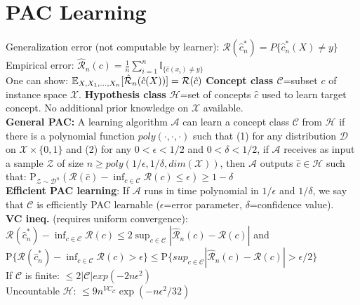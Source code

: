 \section{PAC Learning}

Generalization error (not computable by learner): $\mathcal{R}(\hat{c}_n^*) = P\{ \hat{c}_n^*(X)\neq y \}$ \\
Empirical error: $\hat{\mathcal{R}}_n(c) = \tfrac{1}{n}\sum_{i=1}^n \mathbb{I}_{\{\hat c(x_i)\neq y\}}$ \\
One can show: $\mathbb E_{X,X_1,...,X_n}[\hat{\mathcal{R}}_n(\hat c(X))]=\mathcal{R}(\hat c)$
\textbf{Concept class $\mathcal{C}$}=subset $c$ of instance space $\mathcal{X}$.
\textbf{Hypothesis class $\mathcal{H}$}=set of concepts $\hat c$ used to learn target concept. No additional prior knowledge on $\mathcal{X}$ available.\\
\textbf{General PAC:} A learning algorithm $\mathcal{A}$ can learn a concept class $\mathcal{C}$ from $\mathcal{H}$ if there is a polynomial function $poly(\cdot,\cdot,\cdot)$ such that (1) for any distribution $\mathcal{D}$ on $\mathcal{X} \times \{0,1\}$ and (2) for any $0<\epsilon<1/2$ and $0<\delta<1/2$, if $\mathcal{A}$ receives as input a sample $\mathcal{Z}$ of size $n\geq poly(1/\epsilon,1/\delta,dim(\mathcal{X}))$, then $\mathcal{A}$ outputs $\hat c \in \mathcal{H}$ such that: $\mathrm{P}_{\mathcal{Z}\sim\mathcal{D}^n}(\mathcal{R}(\hat c)-\inf_{c\in\mathcal{C}}\mathcal{R}(c)\leq\epsilon)\geq 1-\delta$\\
\textbf{Efficient PAC learning}: If $\mathcal{A}$ runs in time polynomial in $1/\epsilon$ and $1/\delta$, we say that $\mathcal{C}$ is efficiently PAC learnable ($\epsilon$=error parameter, $\delta$=confidence value).\\
\textbf{VC ineq.} (requires uniform convergence): $\mathcal{R}(\hat c_n^*)-\inf_{c\in \mathcal{C}} \mathcal{R}(c) \leq 2\sup_{c\in \mathcal{C}}|\hat{\mathcal{R}}_n(c) - \mathcal{R}(c)|$ and
$\mathrm{P}\{\mathcal{R}(\hat c_n^*)-\inf_{c\in \mathcal{C}} \mathcal{R}(c)>\epsilon\} \leq \mathrm{P}\{sup_{c\in \mathcal{C}}|\hat{\mathcal{R}}_n(c) - \mathcal{R}(c)|>\epsilon/2\}$\\
If $\mathcal{C}$ is finite: $\leq 2|\mathcal{C}| exp(-2n\epsilon ^2)$\\
Uncountable $\mathcal{H}$: $\leq 9n^{VC_\mathcal{C}}\exp(-n\epsilon^2/32)$




